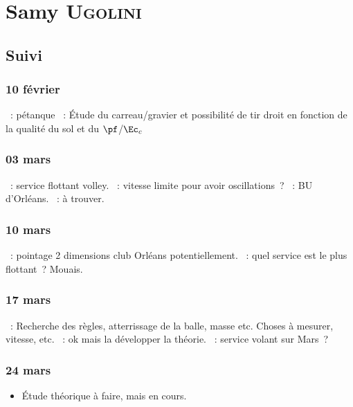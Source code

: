 \documentclass[a4paper, 11pt, final, garamond]{book}
\begin{document}
\chapter{Samy \textsc{Ugolini}}
\label{ch:samy}
\section{Suivi}
\subsection{10 février}
\begin{itemize}
    ~: pétanque
    ~: Étude du carreau/gravier et possibilité de tir droit en
        fonction de la qualité du sol et du $\pf$/$\Ec_c$
\end{itemize}

\subsection{03 mars}
\begin{itemize}
    ~: service flottant volley.
    ~: vitesse limite pour avoir oscillations~?
    ~: BU d'Orléans.
    ~: à trouver.
\end{itemize}

\subsection{10 mars}
\begin{itemize}
    ~: pointage 2 dimensions club Orléans potentiellement.
    ~: quel service est le plus flottant~? Mouais.
\end{itemize}

\subsection{17 mars}
\begin{itemize}
    ~: Recherche des règles, atterrissage de la balle, masse etc.
        Choses à mesurer, vitesse, etc.
    ~: ok mais la développer la théorie.
    ~: service volant sur Mars~?
\end{itemize}

\subsection{24 mars}
\begin{itemize}
    ~: pendant les vacances~: voir pour des trépieds. Vitesse dans
        le sens, vitesse/mouvement perpendiculaire, hauteur du lancer, distance
    ~: à continuer.
    \item Étude théorique à faire, mais en cours.
\end{itemize}
\end{document}
